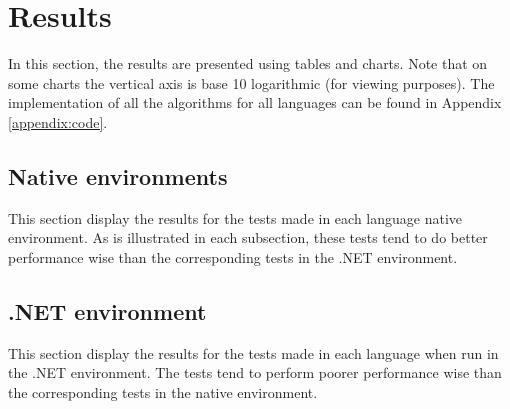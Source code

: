\section{Results}
In this section, the results are presented using tables and charts. Note that on some charts the vertical axis is base 10 logarithmic (for viewing purposes). The implementation of all the algorithms for all languages can be found in Appendix \ref{appendix:code}.

\subsection{Native environments}
This section display the results for the tests made in each language native environment. As is illustrated in each subsection, these tests tend to do better performance wise than the corresponding tests in the .NET environment.







\subsection{.NET environment}
This section display the results for the tests made in each language when run in the .NET environment. The tests tend to perform poorer performance wise than the corresponding tests in the native environment.









